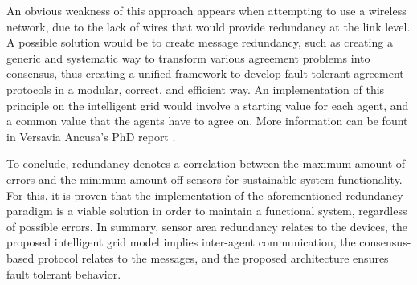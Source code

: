 An obvious weakness of this approach appears when attempting to use a wireless network, due to the lack of wires that would provide
redundancy at the link level. A possible solution would be to create message redundancy, such as creating a generic and systematic 
way to transform various agreement problems into consensus, thus creating a unified framework to develop fault-tolerant agreement 
protocols in a modular, correct, and efficient way. An implementation of this principle on the intelligent grid would involve a starting
value for each agent, and a common value that the agents have to agree on. More information can be fount in Versavia Ancusa's PhD report 
\cite{106, 107}.

To conclude, redundancy denotes a correlation between the maximum amount of errors and the minimum amount off sensors for sustainable
system functionality. For this, it is proven that the implementation of the aforementioned redundancy paradigm is a viable solution in
order to maintain a functional system, regardless of possible errors. In summary, sensor area redundancy relates to the devices, the proposed
intelligent grid model implies inter-agent communication, the consensus-based protocol relates to the messages, and the proposed architecture
ensures fault tolerant behavior.

